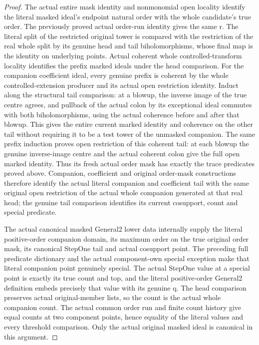 \begin{proof}
The actual entire mask identity and nonmonomial open locality identify the
literal masked ideal's endpoint natural order with the whole candidate's
true order. The previously proved actual order-run identity gives the same
r. The literal split of the restricted original tower is compared with the
restriction of the real whole split by its genuine head and tail
biholomorphisms, whose final map is the identity on underlying points.
Actual coherent whole controlled-transform locality identifies the prefix
marked ideals under the head comparison. For the companion coefficient
ideal, every genuine prefix is coherent by the whole controlled-extension
producer and its actual open restriction identity. Induct along the
structural tail comparison: at a blowup, the inverse image of the true
centre agrees, and pullback of the actual colon by its exceptional ideal
commutes with both biholomorphisms, using the actual coherence before and
after that blowup. This gives the entire current marked identity and
coherence on the other tail without requiring it to be a test tower of
the unmasked companion. The same prefix induction proves open restriction
of this coherent tail: at each blowup the genuine inverse-image centre and
the actual coherent colon give the full open marked identity. Thus its
fresh actual order mask has exactly the trace predicates proved above. Companion, coefficient and original
order-mask constructions therefore identify the actual literal companion
and coefficient tail with the same original open restriction of the actual
whole companion generated at that real head; the genuine tail comparison
identifies its current cosupport, count and special predicate.

The actual canonical masked General2 lower data internally supply the
literal positive-order companion domain, its maximum order on the true
original order mask, its canonical StepOne tail and actual cosupport point.
The preceding full predicate dictionary and the actual component-own special
exception make that literal companion point genuinely special. The actual
StepOne value at a special point is exactly its true count and top, and the
literal positive-order General2 definition embeds precisely that value with
its genuine q. The head comparison preserves actual original-member lists,
so the count is the actual whole companion count. The actual common order
run and finite count history give equal counts at two component points,
hence equality of the literal values and every threshold comparison. Only
the actual original masked ideal is canonical in this argument.
\end{proof}

